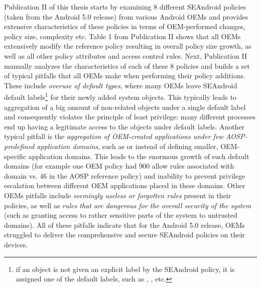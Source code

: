Publication II of this thesis starts by examining 8 different SEAndroid policies (taken from the Android 5.0 release) from various Android OEMs and provides extensive characteristics of these policies in terms of OEM-performed changes, policy size, complexity etc. Table 1 from Publication II shows that all OEMs extensively modify the reference policy resulting in overall policy size growth, as well as all other policy attributes and access control rules. Next, Publication II manually analyzes the characteristics of each of these 8 policies and builds a set of typical pitfalls that all OEMs make when performing their policy additions. These include \textit{overuse of default types}, where many OEMs leave SEAndroid default labels\footnote{if an object is not given an explicit label by the SEAndroid policy, it is assigned one of the default labels, such as , ,  etc.} for their newly added system objects. This typically leads to aggregation of a big amount of non-related objects under a single default label and consequently violates the principle of least privilege: many different processes end up having a legitimate access to the objects under default labels. Another typical pitfall is the \textit{aggregation of OEM-created applications under few AOSP-predefined application domains}, such as  or  instead of defining smaller, OEM-specific application domains. This leads to the enormous growth of such default domains (for example one OEM policy had 900 allow rules associated with  domain vs. 46 in the AOSP reference policy) and inability to prevent privilege escalation between different OEM applications placed in these domains. Other OEMs pitfalls include \textit{seemingly useless or forgotten rules} present in their policies, as well as \textit{rules that are dangerous for the overall security of the system} (such as granting access to rather sensitive parts of the system to untrusted domains). All of these pitfalls indicate that for the Android 5.0 release, OEMs struggled to deliver the comprehensive and secure SEAndroid policies on their devices. 

